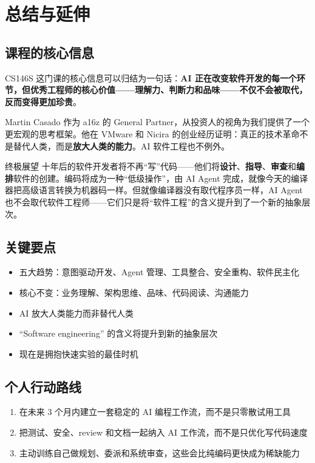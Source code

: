 \section{总结与延伸}

\subsection{课程的核心信息}

CS146S 这门课的核心信息可以归结为一句话：\textbf{AI 正在改变软件开发的每一个环节，但优秀工程师的核心价值——理解力、判断力和品味——不仅不会被取代，反而变得更加珍贵}。

Martin Casado 作为 a16z 的 General Partner，从投资人的视角为我们提供了一个更宏观的思考框架。他在 VMware 和 Nicira 的创业经历证明：真正的技术革命不是替代人类，而是\textbf{放大人类的能力}。AI 软件工程也不例外。

\begin{importantbox}{终极展望}
十年后的软件开发者将不再``写''代码——他们将\textbf{设计}、\textbf{指导}、\textbf{审查}和\textbf{编排}软件的创建。编码将成为一种``低级操作''，由 AI Agent 完成，就像今天的编译器把高级语言转换为机器码一样。但就像编译器没有取代程序员一样，AI Agent 也不会取代软件工程师——它们只是将``软件工程''的含义提升到了一个新的抽象层次。
\end{importantbox}

\subsection{关键要点}

\begin{itemize}
    \item 五大趋势：意图驱动开发、Agent 管理、工具整合、安全重构、软件民主化
    \item 核心不变：业务理解、架构思维、品味、代码阅读、沟通能力
    \item AI 放大人类能力而非替代人类
    \item ``Software engineering'' 的含义将提升到新的抽象层次
    \item 现在是拥抱快速实验的最佳时机
\end{itemize}

\subsection{个人行动路线}

\begin{enumerate}
    \item 在未来 3 个月内建立一套稳定的 AI 编程工作流，而不是只零散试用工具
    \item 把测试、安全、review 和文档一起纳入 AI 工作流，而不是只优化写代码速度
    \item 主动训练自己做规划、委派和系统审查，这些会比纯编码更快成为稀缺能力
\end{enumerate}

